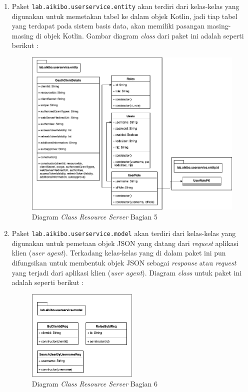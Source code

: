\documentclass[pdftex,12pt, oneside]{article}
\begin{document}
\begin{enumerate}
	\item Paket \texttt{lab.aikibo.userservice.entity} akan terdiri dari kelas-kelas yang digunakan untuk memetakan tabel ke dalam objek Kotlin, jadi tiap tabel yang terdapat pada sistem basis data, akan memiliki pasangan masing-masing di objek Kotlin. Gambar diagram \textit{class} dari paket ini adalah seperti berikut :
	
	\begin{figure}[H]
		\centering
		\includegraphics[width=1\textwidth]{./resources/class-dia-resource-5}
		\caption{Diagram \textit{Class Resource Server} Bagian 5}
		\label{fig:class-dia-resource-5}
	\end{figure}
	
	\item Paket \texttt{lab.aikibo.userservice.model} akan terdiri dari kelas-kelas yang digunakan untuk pemetaan objek JSON yang datang dari \textit{request} aplikasi klien (\textit{user agent}). Terkadang kelas-kelas yang di dalam paket ini pun difungsikan untuk membentuk objek JSON sebagai \textit{response} atau \textit{request} yang terjadi dari aplikasi klien (\textit{user agent}). Diagram \textit{class} untuk paket ini adalah seperti berikut :
	
	\begin{figure}[H]
		\centering
		\includegraphics[width=0.5\textwidth]{./resources/class-dia-resource-6}
		\caption{Diagram \textit{Class Resource Server} Bagian 6}
		\label{fig:class-dia-resource-6}
	\end{figure} 
	

\end{enumerate}
\end{document}
